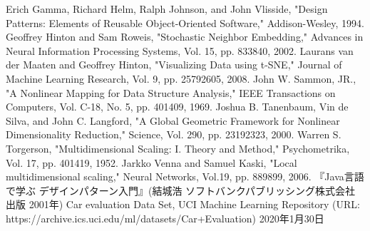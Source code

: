 \documentclass[12pt, dvipdfmx,autodetect-engine]{jsarticle}
\begin{document}
\begin{thebibliography}{7}
     Erich Gamma, Richard Helm, Ralph Johnson, and John Vlisside, "Design Patterns: Elements of Reusable Object-Oriented Software," Addison-Wesley, 1994.
	 Geoffrey Hinton and Sam Roweis, "Stochastic Neighbor Embedding," Advances in Neural Information Processing Systems, Vol. 15, pp. 833840, 2002.
	 Laurans van der Maaten and Geoffrey Hinton, "Visualizing Data using t-SNE," Journal of Machine Learning Research, Vol. 9, pp. 25792605, 2008.
	 John W. Sammon, JR., "A Nonlinear Mapping for Data Structure Analysis," IEEE Transactions on Computers, Vol. C-18, No. 5, pp. 401409, 1969.
	 Joshua B. Tanenbaum, Vin de Silva, and John C. Langford, "A Global Geometric Framework for Nonlinear Dimensionality Reduction," Science, Vol. 290, pp. 23192323, 2000.
	 Warren S. Torgerson, "Multidimensional Scaling: I. Theory and Method," Psychometrika, Vol. 17, pp. 401419, 1952.
	 Jarkko Venna and Samuel Kaski, "Local multidimensional scaling," Neural Networks, Vol.19, pp. 889899, 2006.
	  『Java言語で学ぶ デザインパターン入門』(結城浩 ソフトバンクパブリッシング株式会社出版 2001年)
	 Car evaluation Data Set, UCI Machine Learning Repository (URL: https://archive.ics.uci.edu/ml/datasets/Car+Evaluation) 2020年1月30日
\end{thebibliography}
\end{document}
